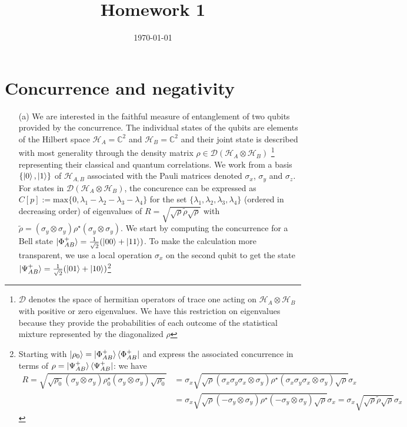 \documentclass[10pt, a4paper]{article}
\title{Homework 1} %
\author{\PA} %
\date{\today} %
\begin{document}
\maketitlepage

\maketableofcontents


\footnotesize{

\section{Concurrence and negativity}

\begin{enumerate}
  \item[(a)] We are interested in the faithful measure of entanglement of two qubits provided by the concurrence. The individual states of the qubits are elements of the Hilbert space $\mathcal{H}_{A} = \mathbb{C}^2$ and $\mathcal{H}_{B} = \mathbb{C}^2$ and their joint state is described with most generality through the density matrix $\rho \in \mathcal{D}(\mathcal{H}_A \otimes \mathcal{H}_B)$ \footnote{$\mathcal{D}$ denotes the space of hermitian operators of trace one acting on $\mathcal{H}_A \otimes \mathcal{H}_B$ with positive or zero eigenvalues. We have this restriction on eigenvalues because they provide the probabilities of each outcome of the statistical mixture represented by the diagonalized $\rho$} representing their classical and quantum correlations. We work from a basis $\{\ket{0}, \ket{1}\}$ of $\mathcal{H}_{A, B}$ associated with the Pauli matrices denoted $\sigma_x$, $\sigma_y$ and $\sigma_z$. For states in $\mathcal{D}(\mathcal{H}_A \otimes \mathcal{H}_B)$, the concurence can be expressed as $C[p] := \text{max}\{0, \lambda_1 - \lambda_2 - \lambda_3 - \lambda_4\}$ for the set $\{\lambda_1, \lambda_2, \lambda_3, \lambda_4\}$ (ordered in decreasing order) of eigenvalues of $R = \sqrt{\sqrt{\rho} \tilde{\rho} \sqrt{\rho}}$ with $\tilde{\rho} = (\sigma_y \otimes \sigma_y) \rho^{\star}(\sigma_y \otimes \sigma_y)$. We start by computing the concurrence for a Bell state $\ket{\Phi^{+}_{AB}} = \frac{1}{\sqrt{2}}(\ket{00} + \ket{11})$. To make the calculation more transparent, we use a local operation $\sigma_x$ on the second qubit to get the state $\ket{\Psi^{+}_{AB}} = \frac{1}{\sqrt{2}}(\ket{01} + \ket{10})$\footnote{Starting with $\ket{\rho_0} = \ket{\Phi^{+}_{AB}}\bra{\Phi^{+}_{AB}}$ and express the associated concurrence in terms of $\rho = \ket{\Psi^{+}_{AB}} \bra{\Psi^{+}_{AB}}$: we have 
  \begin{align*}
    R = \sqrt{\sqrt{\rho_0} (\sigma_y \otimes \sigma_y) \rho_0^{\star}(\sigma_y \otimes \sigma_y) \sqrt{\rho_0}} &= \sigma_x\sqrt{\sqrt{\rho} (\sigma_x\sigma_y\sigma_x \otimes \sigma_y) \rho^{\star}(\sigma_x\sigma_y\sigma_x \otimes \sigma_y) \sqrt{\rho}}\sigma_x \\&= \sigma_x\sqrt{\sqrt{\rho} (-\sigma_y \otimes \sigma_y) \rho^{\star}(-\sigma_y \otimes \sigma_y) \sqrt{\rho}}\sigma_x = \sigma_x\sqrt{\sqrt{\rho} \tilde{\rho} \sqrt{\rho}}\sigma_x

\end{align*}}
\end{enumerate}}
\end{document}
